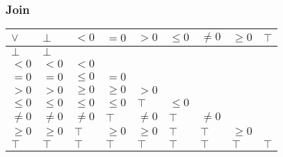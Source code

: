 \documentclass{beamer}
\begin{document}
                    \begin{frame}
                        \frametitle{Join}
                        \begin{table}[]
                            \begin{tabular}{|l|l|l|l|l|l|l|l|l|}
                            \hline
                            $\lor$  & $\bot$  & $<0$    & $=0$    & $>0$    & $\le 0$ & $\ne 0$ & $\ge 0$ & $\top$ \\ \hline
                            $\bot$  & $\bot$  &         &         &         &         &         &         &        \\ \hline
                            $<0$    & $<0$    & $<0$    &         &         &         &         &         &        \\ \hline
                            $=0$    & $=0$    & $\le 0$ & $=0$    &         &         &         &         &        \\ \hline
                            $>0$    & $>0$    & $\ge 0$ & $\ge 0$ & $>0$    &         &         &         &        \\ \hline
                            $\le 0$ & $\le 0$ & $\le 0$ & $\le 0$ & $\top$  & $\le 0$ &         &         &        \\ \hline
                            $\ne 0$ & $\ne 0$ & $\ne 0$ & $\top$  & $\ne 0$ & $\top$  & $\ne 0$ &         &        \\ \hline
                            $\ge 0$ & $\ge 0$ & $\top$  & $\ge 0$ & $\ge 0$ & $\top$  & $\top$  & $\ge 0$ &        \\ \hline
                            $\top$  & $\top$  & $\top$  & $\top$  & $\top$  & $\top$  & $\top$  & $\top$  & $\top$ \\ \hline
                            \end{tabular}
                            \end{table}
                    \end{frame}
\end{document}
